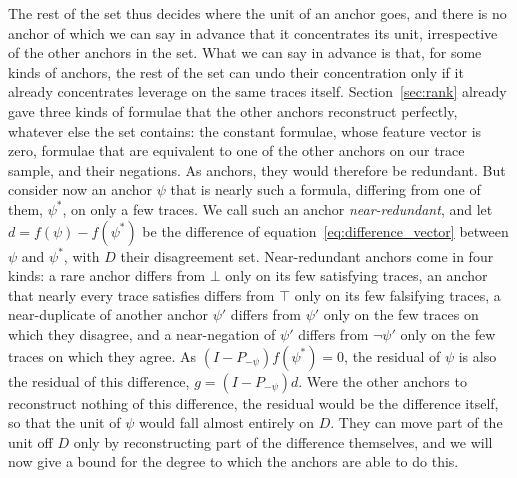\documentclass[titlepage,a4paper,11pt]{report}
\begin{document}
    The rest of the set thus decides where the unit of an anchor goes, and there is no anchor of which we can say in advance that it concentrates its unit, irrespective of the other anchors in the set. What we can say in advance is that, for some kinds of anchors, the rest of the set can undo their concentration only if it already concentrates leverage on the same traces itself. Section~\ref{sec:rank} already gave three kinds of formulae that the other anchors reconstruct perfectly, whatever else the set contains: the constant formulae, whose feature vector is zero, formulae that are equivalent to one of the other anchors on our trace sample, and their negations. As anchors, they would therefore be redundant. But consider now an anchor $\psi$ that is nearly such a formula, differing from one of them, $\psi^\ast$, on only a few traces. We call such an anchor \emph{near-redundant}, and let $d=f(\psi)-f(\psi^\ast)$ be the difference of equation~\eqref{eq:difference_vector} between $\psi$ and $\psi^\ast$, with $D$ their disagreement set. Near-redundant anchors come in four kinds: a rare anchor differs from $\bot$ only on its few satisfying traces, an anchor that nearly every trace satisfies differs from $\top$ only on its few falsifying traces, a near-duplicate of another anchor $\psi'$ differs from $\psi'$ only on the few traces on which they disagree, and a near-negation of $\psi'$ differs from $\neg\psi'$ only on the few traces on which they agree. As $(I-P_{-\psi})f(\psi^\ast)=0$, the residual of $\psi$ is also the residual of this difference, $g=(I-P_{-\psi})d$. Were the other anchors to reconstruct nothing of this difference, the residual would be the difference itself, so that the unit of $\psi$ would fall almost entirely on $D$. They can move part of the unit off $D$ only by reconstructing part of the difference themselves, and we will now give a bound for the degree to which the anchors are able to do this. 
    
\end{document}
